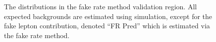 \begin{figure}
  \begin{center}
  \caption{The \ptmiss distributions in the fake rate method validation region. All expected backgrounds are estimated using simulation, except for the fake lepton contribution, denoted ``FR Pred'' which is estimated via the fake rate method.}
  \label{fig:fr_close}
  \end{center}
\end{figure}
